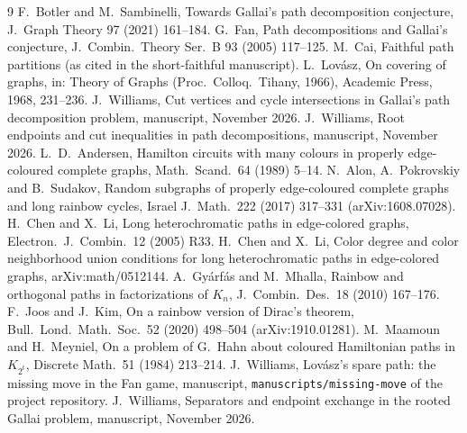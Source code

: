 \documentclass[11pt]{amsart}
\theoremstyle{definition}
\begin{document}
\begin{thebibliography}{9}
 F.~Botler and M.~Sambinelli, Towards Gallai's path decomposition conjecture, J.~Graph Theory 97 (2021) 161--184.
 G.~Fan, Path decompositions and Gallai's conjecture, J.~Combin.\ Theory Ser.~B 93 (2005)
117--125.
 M.~Cai, Faithful path partitions (as cited in the short-faithful manuscript).
 L.~Lov\'asz, On covering of graphs, in: Theory of Graphs (Proc.\ Colloq.\ Tihany, 1966),
Academic Press, 1968, 231--236.
 J.~Williams, Cut vertices and cycle intersections in Gallai's path decomposition problem,
manuscript, November 2026.
 J.~Williams, Root endpoints and cut inequalities in path decompositions, manuscript,
November 2026.
 L.~D.~Andersen, Hamilton circuits with many colours in properly edge-coloured
complete graphs, Math.\ Scand.\ 64 (1989) 5--14.
 N.~Alon, A.~Pokrovskiy and B.~Sudakov, Random subgraphs of properly edge-coloured
complete graphs and long rainbow cycles, Israel J.\ Math.\ 222 (2017) 317--331 (arXiv:1608.07028).
 H.~Chen and X.~Li, Long heterochromatic paths in edge-colored graphs, Electron.\ J.\
Combin.\ 12 (2005) R33.
 H.~Chen and X.~Li, Color degree and color neighborhood union conditions for long
heterochromatic paths in edge-colored graphs, arXiv:math/0512144.
\bibitem{GM10} A.~Gyárfás and M.~Mhalla, Rainbow and orthogonal paths in factorizations of $K_n$,
J.\ Combin.\ Des.\ 18 (2010) 167--176.
 F.~Joos and J.~Kim, On a rainbow version of Dirac's theorem, Bull.\ Lond.\ Math.\ Soc.\
52 (2020) 498--504 (arXiv:1910.01281).
\bibitem{MaMe84} M.~Maamoun and H.~Meyniel, On a problem of G.~Hahn about coloured Hamiltonian paths
in $K_{2^t}$, Discrete Math.\ 51 (1984) 213--214.
\bibitem{MM} J.~Williams, Lov\'asz's spare path: the missing move in the Fan game, manuscript,
\texttt{manuscripts/missing-move} of the project repository.
\bibitem{SP} J.~Williams, Separators and endpoint exchange in the rooted Gallai problem, manuscript,
November 2026.
\end{thebibliography}
\end{document}
